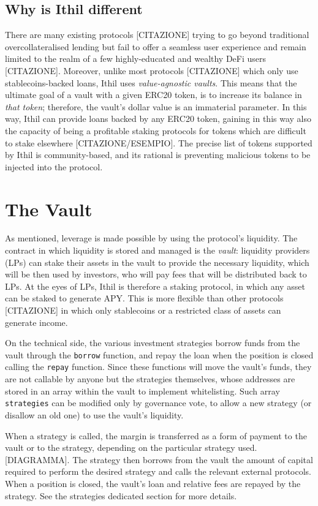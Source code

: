 \documentclass[a4paper,10 pt]{article}
\theoremstyle{definition}
\begin{document}
\subsection{Why is Ithil different}
There are many existing protocols [CITAZIONE] trying to go beyond traditional overcollateralised lending but fail to offer a seamless user experience and remain limited to the realm of a few highly-educated and wealthy DeFi users [CITAZIONE]. Moreover, unlike most protocols [CITAZIONE] which only use stablecoins-backed loans, Ithil uses {\it value-agnostic vaults}. This means that the ultimate goal of a vault with a given ERC20 token, is to increase its balance in {\it that token}; therefore, the vault's dollar value is an immaterial parameter. In this way, Ithil can provide loans backed by any ERC20 token, gaining in this way also the capacity of being a profitable staking protocols for tokens which are difficult to stake elsewhere [CITAZIONE/ESEMPIO]. The precise list of tokens supported by Ithil is community-based, and its rational is preventing malicious tokens to be injected into the protocol.

\section{The Vault}
As mentioned, leverage is made possible by using the protocol's liquidity. The contract in which liquidity is stored and managed is the {\it vault}: liquidity providers (LPs) can stake their assets in the vault to provide the necessary liquidity, which will be then used by investors, who will pay fees that will be distributed back to LPs. At the eyes of LPs, Ithil is therefore a staking protocol, in which any asset can be staked to generate APY. This is more flexible than other protocols [CITAZIONE] in which only stablecoins or a restricted class of assets can generate income.

On the technical side, the various investment strategies borrow funds from the vault through the \verb|borrow| function, and repay the loan when the position is closed calling the \verb|repay| function. Since these functions will move the vault's funds, they are not callable by anyone but the strategies themselves, whose addresses are stored in an array within the vault to implement whitelisting. Such array \verb|strategies| can be modified only by governance vote, to allow a new strategy (or disallow an old one) to use the vault's liquidity.

When a strategy is called, the margin is transferred as a form of payment to the vault or to the strategy, depending on the particular strategy used. [DIAGRAMMA]. The strategy then borrows from the vault the amount of capital required to perform the desired strategy and calls the relevant external protocols. When a position is closed, the vault's loan and relative fees are repayed by the strategy. See the strategies dedicated section for more details.
\end{document}
